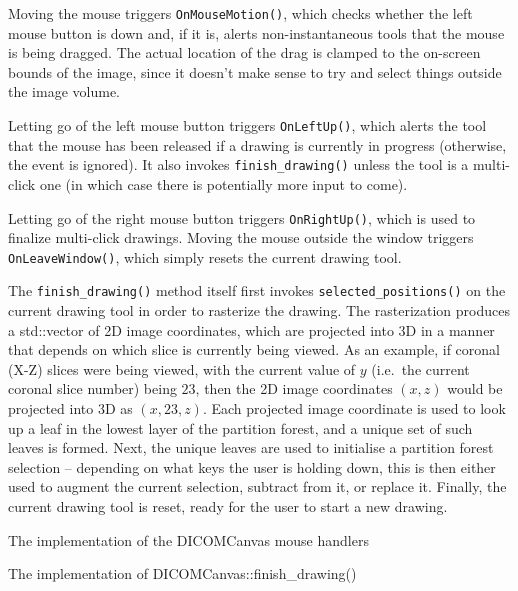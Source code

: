 Moving the mouse triggers \texttt{OnMouseMotion()}, which checks whether the left mouse button is down and, if it is, alerts non-instantaneous tools that the mouse is being dragged. The actual location of the drag is clamped to the on-screen bounds of the image, since it doesn't make sense to try and select things outside the image volume.

Letting go of the left mouse button triggers \texttt{OnLeftUp()}, which alerts the tool that the mouse has been released if a drawing is currently in progress (otherwise, the event is ignored). It also invokes \texttt{finish_drawing()} unless the tool is a multi-click one (in which case there is potentially more input to come).

Letting go of the right mouse button triggers \texttt{OnRightUp()}, which is used to finalize multi-click drawings. Moving the mouse outside the window triggers \texttt{OnLeaveWindow()}, which simply resets the current drawing tool.

The \texttt{finish_drawing()} method itself first invokes \texttt{selected_positions()} on the current drawing tool in order to rasterize the drawing. The rasterization produces a std::vector of 2D image coordinates, which are projected into 3D in a manner that depends on which slice is currently being viewed. As an example, if coronal (X-Z) slices were being viewed, with the current value of $y$ (i.e.~the current coronal slice number) being $23$, then the 2D image coordinates $(x,z)$ would be projected into 3D as $(x,23,z)$. Each projected image coordinate is used to look up a leaf in the lowest layer of the partition forest, and a unique set of such leaves is formed. Next, the unique leaves are used to initialise a partition forest selection -- depending on what keys the user is holding down, this is then either used to augment the current selection, subtract from it, or replace it. Finally, the current drawing tool is reset, ready for the user to start a new drawing.

\begin{stulisting}[p]
\caption{The implementation of the DICOMCanvas mouse handlers}
\label{code:appendixval-mousehandlers}

\end{stulisting}

\begin{stulisting}[p]
\caption{The implementation of DICOMCanvas::finish_drawing()}
\label{code:appendixval-finishdrawing}

\end{stulisting}

